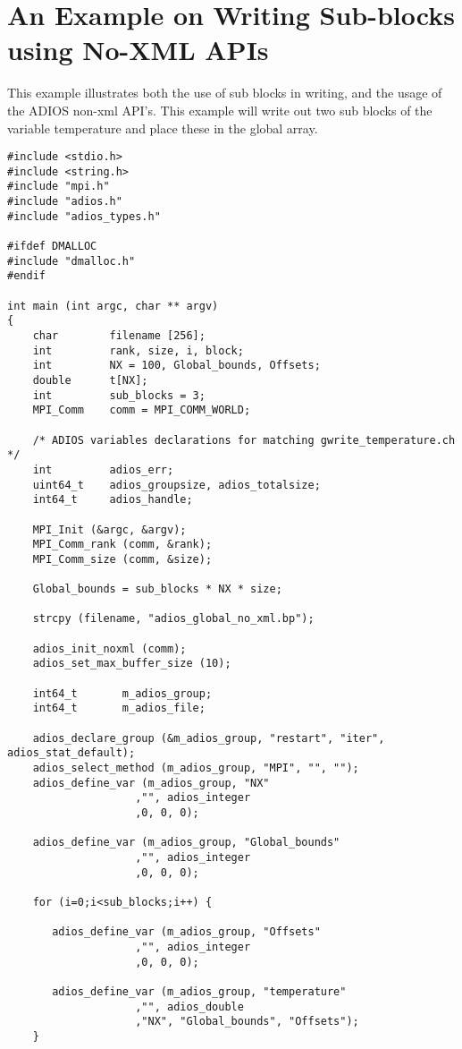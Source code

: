 \section{An Example on Writing Sub-blocks using No-XML APIs}
\label{section-appendix-writing-subblocks}

This example illustrates both the use of sub blocks in writing, and the usage of 
the ADIOS non-xml API's. This example will write out two sub blocks of the variable 
temperature and place these in the global array. 

\begin{lstlisting}[alsolanguage=C]
#include <stdio.h>
#include <string.h>
#include "mpi.h"
#include "adios.h"
#include "adios_types.h"

#ifdef DMALLOC
#include "dmalloc.h"
#endif

int main (int argc, char ** argv)
{
    char        filename [256];
    int         rank, size, i, block;
    int         NX = 100, Global_bounds, Offsets;
    double      t[NX];
    int         sub_blocks = 3;
    MPI_Comm    comm = MPI_COMM_WORLD;

    /* ADIOS variables declarations for matching gwrite_temperature.ch */
    int         adios_err;
    uint64_t    adios_groupsize, adios_totalsize;
    int64_t     adios_handle;

    MPI_Init (&argc, &argv);
    MPI_Comm_rank (comm, &rank);
    MPI_Comm_size (comm, &size);

    Global_bounds = sub_blocks * NX * size;

    strcpy (filename, "adios_global_no_xml.bp");

    adios_init_noxml (comm);
    adios_set_max_buffer_size (10);

    int64_t       m_adios_group;
    int64_t       m_adios_file;

    adios_declare_group (&m_adios_group, "restart", "iter", adios_stat_default);
    adios_select_method (m_adios_group, "MPI", "", "");
    adios_define_var (m_adios_group, "NX"
                    ,"", adios_integer
                    ,0, 0, 0);

    adios_define_var (m_adios_group, "Global_bounds"
                    ,"", adios_integer
                    ,0, 0, 0);

    for (i=0;i<sub_blocks;i++) {

       adios_define_var (m_adios_group, "Offsets"
                    ,"", adios_integer
                    ,0, 0, 0);

       adios_define_var (m_adios_group, "temperature"
                    ,"", adios_double
                    ,"NX", "Global_bounds", "Offsets");
    }


\end{lstlisting}
